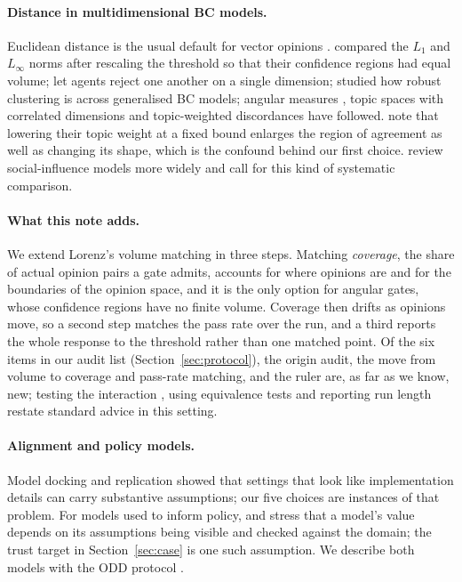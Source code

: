\documentclass[11pt]{article}
\begin{document}
\paragraph{Distance in multidimensional BC models.}
Euclidean distance is the usual default for vector opinions \citep{fortunato2005,lorenz2007}.
\citet{lorenz2008} compared the $L_1$ and $L_\infty$ norms after rescaling the threshold so that their confidence regions had equal volume; \citet{huet2008} let agents reject one another on a single dimension; \citet{kurahashi2016} studied how robust clustering is across generalised BC models; angular measures \citep{schweighofer2020}, topic spaces with correlated dimensions \citep{baumann2021} and topic-weighted discordances \citep{li2026} have followed.
\citet{li2026} note that lowering their topic weight at a fixed bound enlarges the region of agreement as well as changing its shape, which is the confound behind our first choice.
\citet{flache2017} review social-influence models more widely and call for this kind of systematic comparison.

\paragraph{What this note adds.}
We extend Lorenz's volume matching in three steps.
Matching \emph{coverage}, the share of actual opinion pairs a gate admits, accounts for where opinions are and for the boundaries of the opinion space, and it is the only option for angular gates, whose confidence regions have no finite volume.
Coverage then drifts as opinions move, so a second step matches the pass rate over the run, and a third reports the whole response to the threshold rather than one matched point.
Of the six items in our audit list (Section~\ref{sec:protocol}), the origin audit, the move from volume to coverage and pass-rate matching, and the ruler are, as far as we know, new; testing the interaction \citep{gelman2006}, using equivalence tests \citep{lakens2017} and reporting run length restate standard advice in this setting.

\paragraph{Alignment and policy models.}
Model docking and replication \citep{axtell1996,wilensky2007} showed that settings that look like implementation details can carry substantive assumptions; our five choices are instances of that problem.
For models used to inform policy, \citet{gilbert2018} and \citet{windrum2007} stress that a model's value depends on its assumptions being visible and checked against the domain; the trust target in Section~\ref{sec:case} is one such assumption.
We describe both models with the ODD protocol \citep{grimm2020}.
\end{document}
